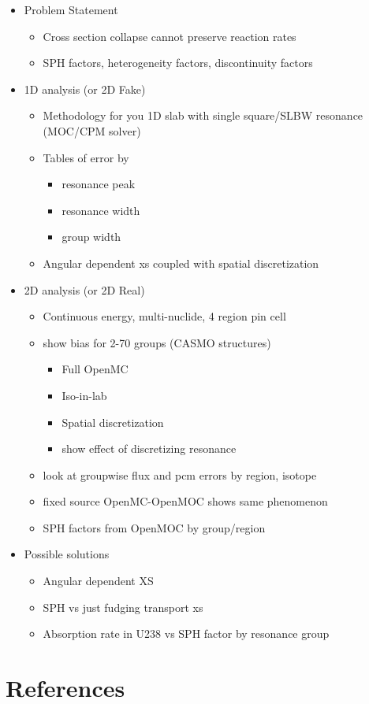 \documentclass[authoryear,5p]{elsarticle}
\begin{document}
\begin{itemize}
\item Problem Statement
\begin{itemize}
\item Cross section collapse cannot preserve reaction rates
\item SPH factors, heterogeneity factors, discontinuity factors
\end{itemize}
\item 1D analysis (or 2D Fake)
\begin{itemize}
\item Methodology for you 1D slab with single square/SLBW resonance (MOC/CPM solver)
\item Tables of error by
\begin{itemize}
\item resonance peak
\item resonance width
\item group width
\end{itemize}
\item Angular dependent xs coupled with spatial discretization
\end{itemize}
\item 2D analysis (or 2D Real)
\begin{itemize}
\item Continuous energy, multi-nuclide, 4 region pin cell
\item show bias for 2-70 groups (CASMO structures)
\begin{itemize}
\item Full OpenMC
\item Iso-in-lab
\item Spatial discretization
\item show effect of discretizing resonance
\end{itemize}
\item look at groupwise flux and pcm errors by region, isotope
\item fixed source OpenMC-OpenMOC shows same phenomenon
\item SPH factors from OpenMOC by group/region
\end{itemize}
\item Possible solutions
\begin{itemize}
\item Angular dependent XS
\item SPH vs just fudging transport xs
\item Absorption rate in U238 vs SPH factor by resonance group
\end{itemize}
\end{itemize}










\section*{References}


\end{document}
